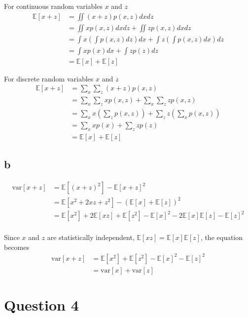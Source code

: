 \documentclass[a4paper,12pt]{article}
\begin{document}
For continuous random variables $x$ and $z$
\begin{align*}
	\mathbb{E}[x+z] &= \iint (x+z) p(x, z) dx dz \\
	&= \iint x p(x, z) dx dz + \iint z p(x, z) dx dz \\
	&= \int x \left( \int p(x, z) dz \right) dx + \int z \left( \int p(x, z) dx \right) dz \\
	&= \int x p(x) dx + \int z p(z) dz \\
	&= \mathbb{E}[x] + \mathbb{E}[z]
\end{align*}

For discrete random variables $x$ and $z$
\begin{align*}
	\mathbb{E}[x+z] &= \sum_x \sum_z (x+z) p(x, z) \\
	&= \sum_x \sum_z x p(x, z) + \sum_x \sum_z z p(x, z) \\
	&= \sum_x x \left( \sum_z p(x, z) \right) + \sum_z z \left( \sum_x p(x, z) \right) \\
	&= \sum_x x p(x) + \sum_z z p(z) \\
	&= \mathbb{E}[x] + \mathbb{E}[z]
\end{align*}

\subsection*{b}

\begin{align*}
	\text{var}[x+z] &= \mathbb{E}[(x+z)^2] - \mathbb{E}[x+z]^2 \\
	&= \mathbb{E}[x^2 + 2xz + z^2] - (\mathbb{E}[x] + \mathbb{E}[z])^2 \\
	&= \mathbb{E}[x^2] + 2\mathbb{E}[xz] + \mathbb{E}[z^2] - \mathbb{E}[x]^2 - 2\mathbb{E}[x]\mathbb{E}[z] - \mathbb{E}[z]^2 \\
\end{align*}

Since $x$ and $z$ are statistically independent, $\mathbb{E}[xz] = \mathbb{E}[x]\mathbb{E}[z]$, the equation becomes
\begin{align*}
	\text{var}[x+z] &= \mathbb{E}[x^2] + \mathbb{E}[z^2] - \mathbb{E}[x]^2 - \mathbb{E}[z]^2 \\
	&= \text{var}[x] + \text{var}[z]
\end{align*}

\section*{Question 4}
\end{document}

